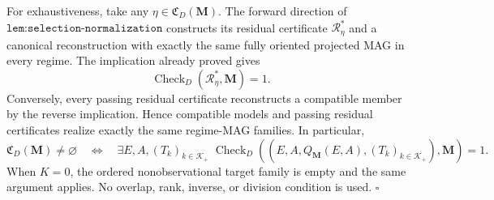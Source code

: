 For exhaustiveness, take any \(\eta\in\mathfrak C_D(\mathbf M)\).  The forward direction of \(\texttt{lem:selection-normalization}\) constructs its residual certificate \(\mathcal R_\eta^*\) and a canonical reconstruction with exactly the same fully oriented projected MAG in every regime.  The implication already proved gives
\[
\operatorname{Check}_{D}(\mathcal R_\eta^*,\mathbf M)=1.
\]
Conversely, every passing residual certificate reconstructs a compatible member by the reverse implication.  Hence compatible models and passing residual certificates realize exactly the same regime-MAG families.  In particular,
\[
\mathfrak C_D(\mathbf M)\ne\varnothing
\quad\Longleftrightarrow\quad
\exists E,A,(T_k)_{k\in\mathcal K_+}\;
\operatorname{Check}_{D}\!\left(
(E,A,Q_{\mathbf M}(E,A),(T_k)_{k\in\mathcal K_+}),\mathbf M
\right)=1.
\]
When \(K=0\), the ordered nonobservational target family is empty and the same argument applies.  No overlap, rank, inverse, or division condition is used. \(\square\)